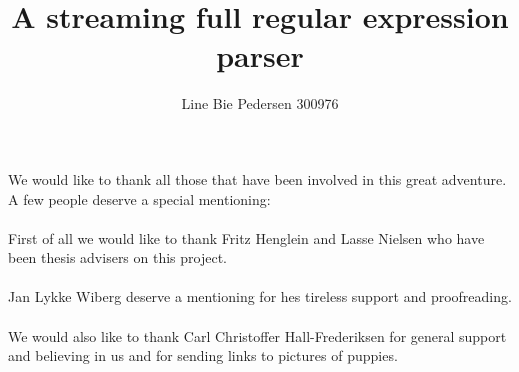 \documentclass[11pt, english, a4paper]{article}
\title{A streaming full regular expression parser}
\author{Line Bie Pedersen 300976}
\date{}
\begin{document}
\maketitle
\thispagestyle{empty}
\clearpage
\setcounter{page}{1}

\clearpage
\tableofcontents
\clearpage
\listoffigures
\clearpage
\listoftables
\clearpage
\renewcommand{\listtheoremname}{List of definitions}
\listoftheorems[ignoreall, show={definition}]
\clearpage
\renewcommand{\listtheoremname}{List of examples}
\listoftheorems[ignoreall, show={example}]

\clearpage
We would like to thank all those that have been involved in this great
adventure. A few people deserve a special mentioning:\\ \\
First of all we would like to thank Fritz Henglein and Lasse Nielsen
who have been thesis advisers on this project.\\ \\
Jan Lykke Wiberg deserve a mentioning for hes tireless support and
proofreading.\\  \\
We would also like to thank Carl Christoffer Hall-Frederiksen for
general support and believing in us and for sending links to pictures
of puppies.  
\clearpage

\setcounter{page}{1} 

\clearpage

\clearpage

\clearpage

\clearpage

\clearpage

\clearpage

\clearpage

\clearpage

\clearpage

\clearpage



\clearpage
\appendix

\end{document}
